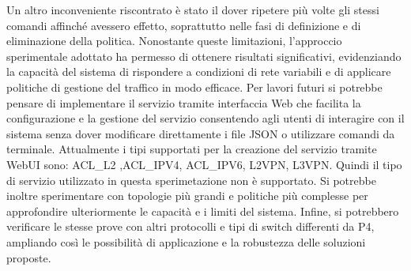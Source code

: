 Un altro inconveniente riscontrato è stato il dover ripetere più volte gli stessi comandi affinché avessero effetto, soprattutto nelle fasi di definizione e di eliminazione della politica.
\newline Nonostante queste limitazioni, l'approccio sperimentale adottato ha permesso di ottenere risultati significativi, 
evidenziando la capacità del sistema di rispondere a condizioni di rete variabili e di applicare politiche di gestione del traffico in modo efficace.
\newline Per lavori futuri si potrebbe pensare di implementare il servizio tramite interfaccia Web
che facilita la configurazione e la gestione del servizio 
consentendo agli utenti di interagire con il sistema senza dover modificare direttamente i file JSON o utilizzare comandi da terminale.
Attualmente i tipi supportati per la creazione del servizio tramite WebUI sono: ACL\_L2 ,ACL\_IPV4, ACL\_IPV6, L2VPN, L3VPN.
Quindi il tipo di servizio utilizzato in questa sperimetazione non è supportato.
\newline Si potrebbe inoltre sperimentare con topologie più grandi e politiche più complesse per approfondire ulteriormente le capacità e i limiti del sistema. 
Infine, si potrebbero verificare le stesse prove  con altri protocolli e tipi di switch differenti da P4,
ampliando così le possibilità di applicazione e la robustezza delle soluzioni proposte.
